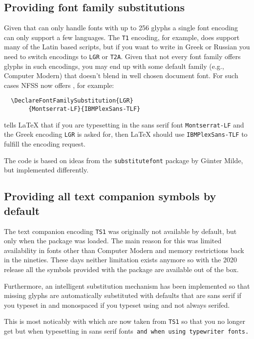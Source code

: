 \documentclass{ltnews}
\providecommand\pdfTeX{\hologo{pdfTeX}}
\begin{document}
\subsection{Providing font family substitutions}

Given that \pdfTeX{} can only handle fonts with up to 256 glyphs a
single font encoding can only support a few languages. The \texttt{T1}
encoding, for example, does support many of the Latin based scripts,
but if you want to write in Greek or Russian you need to switch
encodings to \texttt{LGR} or \texttt{T2A}. Given that not every font
family offers glyphs in such encodings, you may end up with some
default family (e.g., Computer Modern) that doesn’t blend in well
chosen document font.  For such cases NFSS now offers
, for example:
\begin{verbatim}
  \DeclareFontFamilySubstitution{LGR}
       {Montserrat-LF}{IBMPlexSans-TLF}
\end{verbatim}
tells \LaTeX{} that if you are typesetting in the sans serif font
\texttt{Montserrat-LF} and the Greek encoding \texttt{LGR} is asked
for, then \LaTeX{} should use \texttt{IBMPlexSans-TLF} to fulfill the
encoding request.

The code is based on ideas from the \texttt{substitutefont}
package by Günter Milde, but implemented differently.


\subsection{Providing all text companion symbols by default}

The text companion encoding \texttt{TS1} was originally not available
by default, but only when the  package was loaded. The
main reason for this was limited availability in fonts other than
Computer Modern and memory restrictions back in the nineties. These
days neither limitation exists anymore so with the 2020 release all
the symbols provided with the  package are available out
of the box.

Furthermore, an intelligent substitution mechanism has been
implemented so that missing glyphs are automatically substituted with
defaults that are sans serif if you typeset in  and
monospaced if you typeset using  and not always serifed.


\textsf{This is most noticably with  which are now
  taken from \texttt{TS1} so that you no longer get
  \textrm{} but  when typesetting
  in sans serif fonts}\texttt{ and  when using
  typewriter fonts.}
\end{document}
